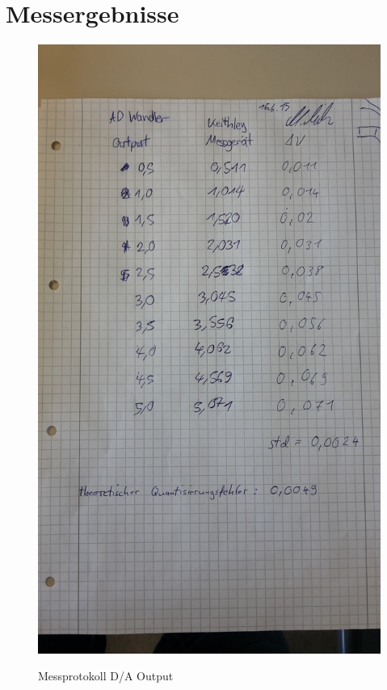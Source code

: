 \documentclass[TGAI_Laborbericht.tex]{subfiles}
\begin{document}
\section{Messergebnisse}
\label{chap:APPENDIX_MEASUREMENT_SOURCE}
\begin{figure}[H]
	\includegraphics[width=1.5\textwidth, angle = -90]{media/Messprotokoll1.jpg}
	\label{Output}
	\caption{Messprotokoll D/A Output}
\end{figure}
\end{document}
